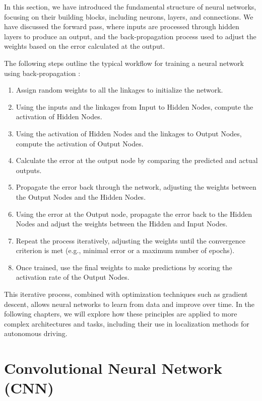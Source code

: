 In this section, we have introduced the fundamental structure of neural networks, focusing on their building blocks, including neurons, layers, and connections. We have discussed the forward pass, where inputs are processed through hidden layers to produce an output, and the back-propagation process used to adjust the weights based on the error calculated at the output.

The following steps outline the typical workflow for training a neural network using back-propagation \cite{10.11648/j.ajnna.20190501.12}:

\begin{enumerate} 
    \item Assign random weights to all the linkages to initialize the network. 
    \item Using the inputs and the linkages from Input to Hidden Nodes, compute the activation of Hidden Nodes. 
    \item Using the activation of Hidden Nodes and the linkages to Output Nodes, compute the activation of Output Nodes. 
    \item Calculate the error at the output node by comparing the predicted and actual outputs. 
    \item Propagate the error back through the network, adjusting the weights between the Output Nodes and the Hidden Nodes. 
    \item Using the error at the Output node, propagate the error back to the Hidden Nodes and adjust the weights between the Hidden and Input Nodes. 
    \item Repeat the process iteratively, adjusting the weights until the convergence criterion is met (e.g., minimal error or a maximum number of epochs). 
    \item Once trained, use the final weights to make predictions by scoring the activation rate of the Output Nodes. 
\end{enumerate}

This iterative process, combined with optimization techniques such as gradient descent, allows neural networks to learn from data and improve over time. In the following chapters, we will explore how these principles are applied to more complex architectures and tasks, including their use in localization methods for autonomous driving.

\section{Convolutional Neural Network (CNN)}

